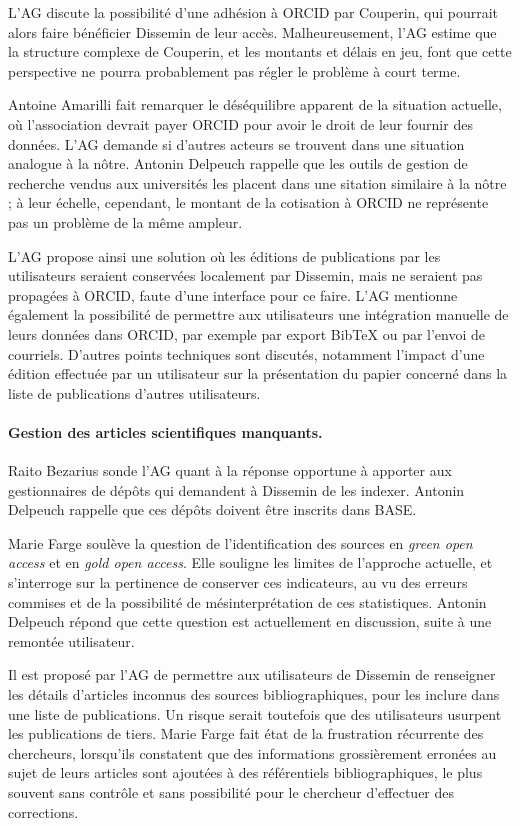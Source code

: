 \documentclass{scrartcl}
\begin{document}
L'AG discute la possibilité d'une adhésion à ORCID par Couperin, qui pourrait
alors faire bénéficier Dissemin de leur accès. Malheureusement, l'AG estime que
la structure complexe de Couperin, et les montants et délais en jeu, font que
cette perspective ne pourra probablement pas régler le problème à court terme.

Antoine Amarilli fait remarquer le déséquilibre apparent de la situation
actuelle, où l'association devrait payer ORCID pour avoir le droit de leur
fournir des données. L'AG demande si d'autres acteurs se trouvent dans une
situation analogue à la nôtre. Antonin Delpeuch rappelle que les outils de
gestion de recherche vendus aux universités les placent dans une sitation
similaire à la nôtre ; à leur échelle, cependant, le montant de la cotisation à
ORCID ne représente pas un problème de la même ampleur.

L'AG propose ainsi une solution où les éditions de publications par les
utilisateurs seraient conservées localement par Dissemin, mais ne seraient pas
propagées à ORCID, faute d'une interface pour ce faire. L'AG mentionne également
la possibilité de permettre aux utilisateurs une intégration manuelle de leurs
données dans ORCID, par exemple par export BibTeX ou par l'envoi de courriels.
D'autres points techniques sont discutés, notamment l'impact d'une édition
effectuée par un utilisateur sur la présentation du papier concerné dans la
liste de publications d'autres utilisateurs.

\paragraph{Gestion des articles scientifiques manquants.} Raito Bezarius sonde
l'AG quant à la réponse opportune à apporter aux gestionnaires de dépôts qui
demandent à Dissemin de les indexer. Antonin Delpeuch rappelle que ces dépôts
doivent être inscrits dans BASE.

Marie Farge soulève la question de l'identification des sources en \emph{green
open access} et en \emph{gold open access}. Elle souligne les limites de
l'approche actuelle, et s'interroge sur la pertinence de conserver ces
indicateurs, au vu des erreurs commises et de la possibilité de
mésinterprétation de ces statistiques. Antonin Delpeuch répond que cette
question est actuellement en discussion, suite à une remontée utilisateur.

Il est proposé par l'AG de permettre aux utilisateurs de Dissemin de renseigner
les détails d'articles inconnus des sources bibliographiques, pour les inclure
dans une liste de publications. Un risque serait toutefois que des utilisateurs
usurpent les publications de tiers. Marie Farge fait état de la frustration
récurrente des chercheurs, lorsqu'ils constatent que des informations
grossièrement erronées au sujet de leurs articles sont ajoutées à des
référentiels bibliographiques, le plus souvent sans contrôle et sans possibilité
pour le chercheur d'effectuer des corrections.
\end{document}
